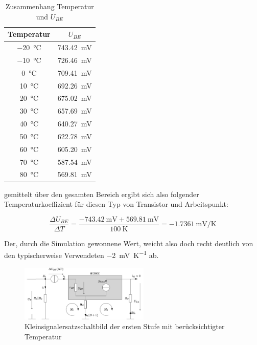\begin{table}[H]
    \centering
    \begin{tabular}{|c|c|}
    \hline
         Temperatur & $U_{BE}$  \\ \hline \hline
         \SI{-20}{\celsius}& \SI{743.42}{\milli \volt} \\ \hline
         \SI{-10}{\celsius}& \SI{726.46}{\milli \volt} \\ \hline
         \SI{0}{\celsius}& \SI{709.41}{\milli \volt} \\ \hline
         \SI{10}{\celsius}& \SI{692.26}{\milli \volt} \\ \hline
         \SI{20}{\celsius}& \SI{675.02}{\milli \volt} \\ \hline
         \SI{30}{\celsius}& \SI{657.69}{\milli \volt} \\ \hline
         \SI{40}{\celsius}& \SI{640.27}{\milli \volt} \\ \hline
         \SI{50}{\celsius}& \SI{622.78}{\milli \volt} \\ \hline
         \SI{60}{\celsius}& \SI{605.20}{\milli \volt} \\ \hline
         \SI{70}{\celsius}& \SI{587.54}{\milli \volt} \\ \hline
         \SI{80}{\celsius}& \SI{569.81}{\milli \volt} \\ \hline
    \end{tabular}
    \caption{Zusammenhang Temperatur und $U_{BE}$}
    \label{tab:my_label}
\end{table}

gemittelt über den gesamten Bereich ergibt sich also folgender Temperaturkoeffizient für diesen Typ von Transistor und Arbeitspunkt:

\begin{equation*}
    \frac{\Delta U_{BE}}{\Delta T} = \frac{-\SI{743.42}{\milli \volt} + \SI{569.81}{\milli \volt}}{\SI{100}{\kelvin}} = \SI{-1.7361}{\milli \volt \per \kelvin}
\end{equation*}

Der, durch die Simulation gewonnene Wert, weicht also doch recht deutlich von den typischerweise Verwendeten \SI{-2}{\milli \volt \per \kelvin} ab.

\begin{figure}[H]
    \centering
    \includegraphics[width = 0.55\textwidth]{tex/1_Microphone/pictures/KSESB_temp.pdf}
    \caption{Kleinsignalersatzschaltbild der ersten Stufe mit berücksichtigter Temperatur}
    \label{fig:my_label}
\end{figure}

